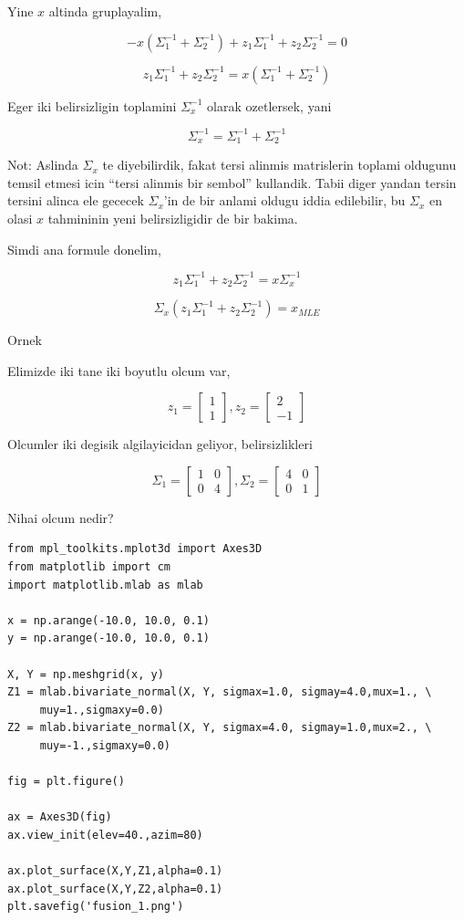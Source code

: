 \documentclass[12pt,fleqn]{article}\usepackage{../common}
\begin{document}
Yine $x$ altinda gruplayalim,

$$ 
-x(\Sigma_1^{-1} + \Sigma_2^{-1}) + z_1\Sigma_1^{-1}  + z_2\Sigma_2^{-1}  = 0
$$

$$ 
z_1\Sigma_1^{-1}  + z_2\Sigma_2^{-1}  = x(\Sigma_1^{-1} + \Sigma_2^{-1}) 
$$

Eger iki belirsizligin toplamini $\Sigma_x^{-1}$ olarak ozetlersek, yani 

$$ 
\Sigma_x^{-1} = \Sigma_1^{-1} + \Sigma_2^{-1}
$$

Not: Aslinda $\Sigma_x$ te diyebilirdik, fakat tersi alinmis matrislerin
toplami oldugunu temsil etmesi icin ``tersi alinmis bir sembol''
kullandik. Tabii diger yandan tersin tersini alinca ele gececek
$\Sigma_x$'in de bir anlami oldugu iddia edilebilir, bu $\Sigma_x$ en olasi
$x$ tahmininin yeni belirsizligidir de bir bakima. 

Simdi ana formule donelim,

$$ 
z_1\Sigma_1^{-1}  + z_2\Sigma_2^{-1}  = x\Sigma_x^{-1}
$$


$$ 
\Sigma_x (z_1\Sigma_1^{-1}  + z_2\Sigma_2^{-1}) = x_{MLE}
$$

Ornek

Elimizde iki tane iki boyutlu olcum var, 

$$ z_1 = \left[\begin{array}{c}
1 \\ 1
\end{array}\right], 
z_2 = \left[\begin{array}{r}
2 \\ -1
\end{array}\right] 
$$

Olcumler iki degisik algilayicidan geliyor, belirsizlikleri

$$ 
\Sigma_1 = 
\left[\begin{array}{cc}
1 & 0 \\ 0 & 4
\end{array}\right], 
\Sigma_2 = 
\left[\begin{array}{cc}
4 & 0 \\ 0 & 1
\end{array}\right]
 $$

Nihai olcum nedir? 

\begin{verbatim}
from mpl_toolkits.mplot3d import Axes3D
from matplotlib import cm
import matplotlib.mlab as mlab

x = np.arange(-10.0, 10.0, 0.1)
y = np.arange(-10.0, 10.0, 0.1)

X, Y = np.meshgrid(x, y)
Z1 = mlab.bivariate_normal(X, Y, sigmax=1.0, sigmay=4.0,mux=1., \
     muy=1.,sigmaxy=0.0)
Z2 = mlab.bivariate_normal(X, Y, sigmax=4.0, sigmay=1.0,mux=2., \
     muy=-1.,sigmaxy=0.0)

fig = plt.figure()

ax = Axes3D(fig)
ax.view_init(elev=40.,azim=80)

ax.plot_surface(X,Y,Z1,alpha=0.1)
ax.plot_surface(X,Y,Z2,alpha=0.1)
plt.savefig('fusion_1.png')
\end{verbatim}
\end{document}
